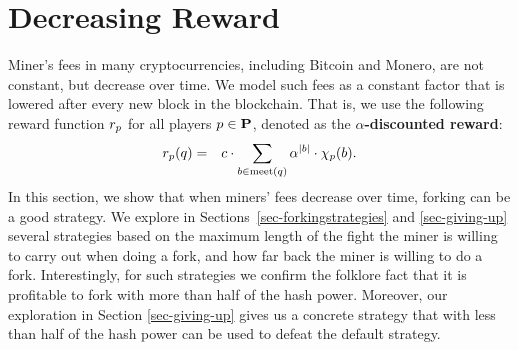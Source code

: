 
\section{Decreasing Reward}
\label{sec-dec}


Miner's fees in many cryptocurrencies, including Bitcoin and Monero, are not constant, but decrease over time.
We model such 
fees as a constant factor that is lowered after every new block in the blockchain. That is, 
we use the following reward function $r_p$ for all players $p \in \mathbf{P}$, denoted as the \textbf{$\alpha$-discounted reward}: 
\begin{eqnarray*}
r_p(q) & = & 
c \cdot \sum_{b \in \text{\rm meet}(q)} \alpha^{|b|} \cdot \chi_p(b).
\end{eqnarray*}
In this section, we show that when miners' fees decrease over time, forking can be a good strategy. We explore in Sections~\ref{sec-forkingstrategies} and \ref{sec-giving-up} several strategies based on the maximum length of the fight the miner is willing to carry out when doing a fork, and how far back the miner is willing to do a fork. Interestingly, for such strategies we confirm the folklore fact that it is profitable to fork with more than half of the hash power. Moreover, our exploration in Section \ref{sec-giving-up} gives us a concrete strategy that with less than half of the hash power 
can be used to defeat the default strategy. %

